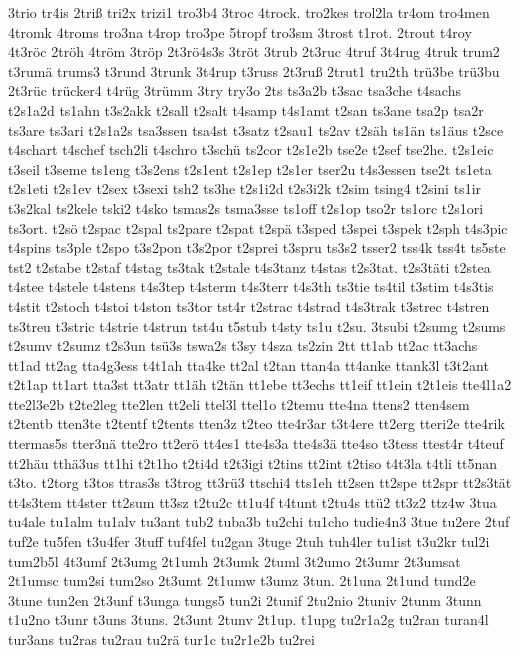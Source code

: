 {3trio
tr4is
2triß
tri2x
trizi1
tro3b4
3troc
4trock.
tro2kes
trol2la
tr4om
tro4men
4tromk
4troms
tro3na
t4rop
tro3pe
5tropf
tro3sm
3trost
t1rot.
2trout
t4roy
4t3röc
2tröh
4tröm
3tröp
2t3rö4s3s
3tröt
3trub
2t3ruc
4truf
3t4rug
4truk
trum2
t3rumä
trums3
t3rund
3trunk
3t4rup
t3russ
2t3ruß
2trut1
tru2th
trü3be
trü3bu
2t3rüc
trücker4
t4rüg
3trümm
3try
try3o
2ts
ts3a2b
t3sac
tsa3che
t4sachs
t2s1a2d
ts1ahn
t3s2akk
t2sall
t2salt
t4samp
t4s1amt
t2san
ts3ane
tsa2p
tsa2r
ts3are
ts3ari
t2s1a2s
tsa3ssen
tsa4st
t3satz
t2sau1
ts2av
t2säh
ts1än
ts1äus
t2sce
t4schart
t4schef
tsch2li
t4schro
t3schü
ts2cor
t2s1e2b
tse2e
t2sef
tse2he.
t2s1eic
t3seil
t3seme
ts1eng
t3s2ens
t2s1ent
t2s1ep
t2s1er
tser2u
t4s3essen
tse2t
ts1eta
t2s1eti
t2s1ev
t2sex
t3sexi
tsh2
ts3he
t2s1i2d
t2s3i2k
t2sim
tsing4
t2sini
ts1ir
t3s2kal
ts2kele
tski2
t4sko
tsmas2s
tsma3sse
ts1off
t2s1op
tso2r
ts1orc
t2s1ori
ts3ort.
t2sö
t2spac
t2spal
ts2pare
t2spat
t2spä
t3sped
t3spei
t3spek
t2sph
t4s3pic
t4spins
ts3ple
t2spo
t3s2pon
t3s2por
t2sprei
t3spru
ts3s2
tsser2
tss4k
tss4t
ts5ste
tst2
t2stabe
t2staf
t4stag
ts3tak
t2stale
t4s3tanz
t4stas
t2s3tat.
t2s3täti
t2stea
t4stee
t4stele
t4stens
t4s3tep
t4sterm
t4s3terr
t4s3th
ts3tie
ts4til
t3stim
t4s3tis
t4stit
t2stoch
t4stoi
t4ston
ts3tor
tst4r
t2strac
t4strad
t4s3trak
t3strec
t4stren
ts3treu
t3stric
t4strie
t4strun
tst4u
t5stub
t4sty
ts1u
t2su.
3tsubi
t2sumg
t2sums
t2sumv
t2sumz
t2s3un
tsü3s
tswa2s
t3sy
t4sza
ts2zin
2tt
tt1ab
tt2ac
tt3achs
tt1ad
tt2ag
tta4g3ess
t4t1ah
tta4ke
tt2al
t2tan
ttan4a
tt4anke
ttank3l
t3t2ant
t2t1ap
tt1art
tta3st
tt3atr
tt1äh
t2tän
tt1ebe
tt3echs
tt1eif
tt1ein
t2t1eis
tte4l1a2
tte2l3e2b
t2te2leg
tte2len
tt2eli
ttel3l
ttel1o
t2temu
tte4na
ttens2
tten4sem
t2tentb
tten3te
t2tentf
t2tents
tten3z
t2teo
tte4r3ar
t3t4ere
tt2erg
tteri2e
tte4rik
ttermas5s
tter3nä
tte2ro
tt2erö
tt4es1
tte4s3a
tte4s3ä
tte4so
t3tess
ttest4r
t4teuf
tt2häu
tthä3us
tt1hi
t2t1ho
t2ti4d
t2t3igi
t2tins
tt2int
t2tiso
t4t3la
t4tli
tt5nan
t3to.
t2torg
t3tos
ttras3s
t3trog
tt3rü3
ttschi4
tts1eh
tt2sen
tt2spe
tt2spr
tt2s3tät
tt4s3tem
tt4ster
tt2sum
tt3sz
t2tu2c
tt1u4f
t4tunt
t2tu4s
ttü2
tt3z2
ttz4w
3tua
tu4ale
tu1alm
tu1alv
tu3ant
tub2
tuba3b
tu2chi
tu1cho
tudie4n3
3tue
tu2ere
2tuf
tuf2e
tu5fen
t3u4fer
3tuff
tuf4fel
tu2gan
3tuge
2tuh
tuh4ler
tu1ist
t3u2kr
tul2i
tum2b5l
4t3umf
2t3umg
2t1umh
2t3umk
2tuml
3t2umo
2t3umr
2t3umsat
2t1umsc
tum2si
tum2so
2t3umt
2t1umw
t3umz
3tun.
2t1una
2t1und
tund2e
3tune
tun2en
2t3unf
t3unga
tungs5
tun2i
2tunif
2tu2nio
2tuniv
2tunm
3tunn
t1u2no
t3unr
t3uns
3tuns.
2t3unt
2tunv
2t1up.
t1upg
tu2r1a2g
tu2ran
turan4l
tur3ans
tu2ras
tu2rau
tu2rä
tur1c
tu2r1e2b
tu2rei
}
